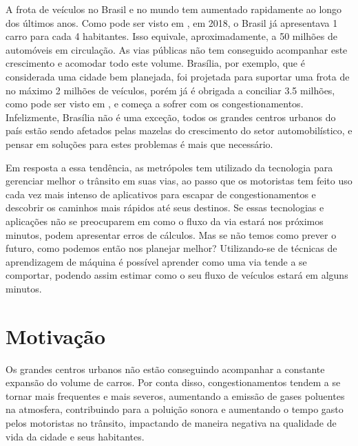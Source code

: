 


A frota  de  veículos no Brasil e no mundo tem aumentado rapidamente ao longo  dos últimos anos. Como pode ser visto em \cite{G1}, em 2018, o Brasil já apresentava 1 carro para cada 4 habitantes. Isso equivale, aproximadamente, a 50 milhões de automóveis em circulação. As vias públicas não tem conseguido acompanhar este crescimento e acomodar todo este volume. Brasília, por exemplo, que é considerada uma cidade bem planejada, foi projetada para suportar uma frota de no máximo 2 milhões de veículos, porém já é obrigada a conciliar 3.5 milhões, como pode ser visto em \cite{detran_2018}, e começa a sofrer com os congestionamentos. Infelizmente, Brasília não é uma exceção, todos os grandes centros urbanos do país estão sendo afetados pelas mazelas do crescimento do setor automobilístico, e pensar em soluções para estes problemas é mais que necessário.

Em resposta a essa tendência, as metrópoles tem utilizado da tecnologia para gerenciar melhor o trânsito em suas vias, ao passo que os motoristas tem feito uso cada vez mais intenso de aplicativos para escapar de congestionamentos e descobrir os caminhos mais rápidos até seus destinos. Se essas tecnologias e aplicações não se preocuparem em como o fluxo da via estará nos próximos minutos, podem apresentar erros de cálculos. Mas se não temos como prever o futuro, como podemos então nos planejar melhor? Utilizando-se de técnicas de aprendizagem de máquina é possível aprender como uma via tende a se comportar, podendo assim estimar como o seu fluxo de veículos estará em alguns minutos.

\section{Motivação}

Os grandes centros urbanos não estão conseguindo acompanhar a constante expansão do volume de carros. Por conta disso, congestionamentos tendem a se tornar mais frequentes e mais severos, aumentando a emissão de gases poluentes na atmosfera, contribuindo para a poluição sonora e aumentando o tempo gasto pelos motoristas no trânsito, impactando de maneira negativa na qualidade de vida da cidade e seus habitantes.

